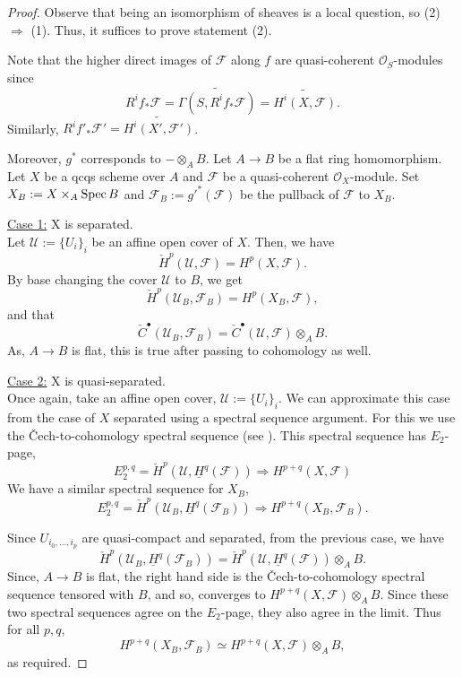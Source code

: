 \documentclass[11pt]{amsart}
\newcommand{\Spec}{{\rm Spec \,}}
\renewcommand{\tilde}{\widetilde}
\newcommand{\sF}{{\mathcal F}}
\newcommand{\sO}{{\mathcal O}}
\newcommand{\sU}{{\mathcal U}}
\theoremstyle{definition}
\begin{document}
\begin{proof}
	Observe that being an isomorphism of sheaves is a local question, so (2) $\Rightarrow$ (1). Thus, it suffices to prove statement (2).
	
	Note that the higher direct images of $\sF$ along $f$ are quasi-coherent $\sO_S$-modules since  \[R^if_*\sF=\tilde{\Gamma (S,R^if_*\sF)}=\tilde{H^i(X,\sF)}.\]
	Similarly, $R^if'_*\sF'= \tilde{H^i(X',\sF')}$.
	
	Moreover, $g^*$ corresponds to $-\otimes_A B$. Let $A\rightarrow B$ be a flat ring homomorphism. Let $X$ be a qcqs scheme over $A$ and $\sF$ be a quasi-coherent $\sO_X$-module. Set $X_B:= X\times_A \Spec B$ and $\sF_B:= g'^*(\sF)$ be the pullback of $\sF$ to $X_B$.
	
	\noindent\underline{Case 1:} X is separated.\\
	Let $\sU:=\{U_i\}_i$ be an affine open cover of $X$. Then, we have
	\[ \check{H}^p(\sU,\sF)=H^p(X,\sF).\]
	By base changing the cover $\sU$ to $B$, we get
	\[\check{H}^p(\sU_B,\sF_B)=H^p(X_B,\sF),\]
	and that
	\[\check{C}^{\bullet}(\sU_B,\sF_B)=\check{C}^{\bullet}(\sU,\sF)\otimes_A B.\]
	As, $A\rightarrow B$ is flat, this is true after passing to cohomology as well.
	
	\noindent\underline{Case 2:} X is quasi-separated.\\
	Once again, take an affine open cover, $\sU:=\{U_i\}_i$. We can approximate this case from the case of $X$ separated using a spectral sequence argument. For this we use the \v{C}ech-to-cohomology spectral sequence (see \cite[Tag 01ES]{stacks-project}). This spectral sequence has $E_2$-page,
	\[E^{p,q}_2=\check{H}^p(\sU,\underline{H}^q(\sF))\Rightarrow H^{p+q}(X,\sF)\]
	We have a similar spectral sequence for $X_B$,
	\[E^{p,q}_2=\check{H}^p(\sU_B,\underline{H}^q(\sF_B))\Rightarrow H^{p+q}(X_B,\sF_B).\]
	
	Since $U_{i_0,\ldots,i_p}$ are quasi-compact and separated, from the previous case, we have
	\[\check{H}^p(\sU_B,\underline{H}^q(\sF_B))=\check{H}^p(\sU,\underline{H}^q(\sF)) \otimes_A B.\]
	Since, $A\rightarrow B$ is flat, the right hand side is the \v{C}ech-to-cohomology spectral sequence tensored with $B$, and so, converges to $H^{p+q}(X,\sF)\otimes_A B$. Since these two spectral sequences agree on the $E_2$-page, they also agree in the limit. Thus for all $p,q$,
	\[H^{p+q}(X_B,\sF_B) \simeq H^{p+q}(X,\sF)\otimes_A B,\]
	as required.
\end{proof}
\end{document}
